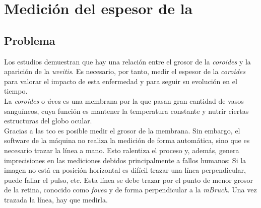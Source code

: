 \chapter{Medición del espesor de la }
\section{Problema}
Los estudios demuestran que hay una relación entre el grosor de la
\emph{\gls{coroides}} y la aparición de la \emph{\gls{uveitis}}. Es
necesario, por tanto, medir el espesor de la \emph{\gls{coroides}}
para valorar el impacto de esta enfermedad y para seguir su evolución
en el tiempo.\\
La \emph{\gls{coroides}} o \emph{úvea} es una membrana por la que
pasan gran cantidad de vasos sanguíneos, cuya función es mantener la
temperatura
constante y nutrir ciertas estructuras del globo ocular. \\
Gracias a las \gls{tco} es posible medir el grosor de la membrana. Sin
embargo, el software de la máquina no realiza la medición de forma
automática, sino que es necesario trazar la línea a mano. Esto
ralentiza el proceso y, además, genera imprecisiones en las mediciones
debidos principalmente a fallos humanos: Si la imagen no está en
posición horizontal es difícil trazar una línea perpendicular, puede
fallar el pulso, etc. Esta línea se debe trazar por el punto de menor
grosor de la retina, conocido como \emph{\gls{fovea}} y de forma
perpendicular a la \emph{\gls{mBruch}}. Una vez trazada la línea, hay
que medirla.


